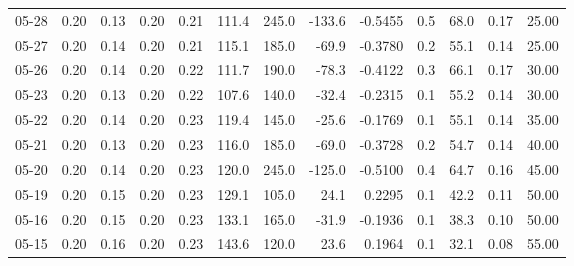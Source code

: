 \begin{threeparttable}
{\begin{tabular}{lrrrrrrrrrrrr}
  05-28 &          0.20 &          0.13 &          0.20 &        0.21 &               111.4 &               245.0 &     -133.6 &      -0.5455 &                 0.5 &             68.0 &            0.17 &                  25.00 \\
  05-27 &          0.20 &          0.14 &          0.20 &        0.21 &               115.1 &               185.0 &      -69.9 &      -0.3780 &                 0.2 &             55.1 &            0.14 &                  25.00 \\
  05-26 &          0.20 &          0.14 &          0.20 &        0.22 &               111.7 &               190.0 &      -78.3 &      -0.4122 &                 0.3 &             66.1 &            0.17 &                  30.00 \\
  05-23 &          0.20 &          0.13 &          0.20 &        0.22 &               107.6 &               140.0 &      -32.4 &      -0.2315 &                 0.1 &             55.2 &            0.14 &                  30.00 \\
  05-22 &          0.20 &          0.14 &          0.20 &        0.23 &               119.4 &               145.0 &      -25.6 &      -0.1769 &                 0.1 &             55.1 &            0.14 &                  35.00 \\
  05-21 &          0.20 &          0.13 &          0.20 &        0.23 &               116.0 &               185.0 &      -69.0 &      -0.3728 &                 0.2 &             54.7 &            0.14 &                  40.00 \\
  05-20 &          0.20 &          0.14 &          0.20 &        0.23 &               120.0 &               245.0 &     -125.0 &      -0.5100 &                 0.4 &             64.7 &            0.16 &                  45.00 \\
  05-19 &          0.20 &          0.15 &          0.20 &        0.23 &               129.1 &               105.0 &       24.1 &       0.2295 &                 0.1 &             42.2 &            0.11 &                  50.00 \\
  05-16 &          0.20 &          0.15 &          0.20 &        0.23 &               133.1 &               165.0 &      -31.9 &      -0.1936 &                 0.1 &             38.3 &            0.10 &                  50.00 \\
  05-15 &          0.20 &          0.16 &          0.20 &        0.23 &               143.6 &               120.0 &       23.6 &       0.1964 &                 0.1 &             32.1 &            0.08 &                  55.00 \\

\end{tabular}}
\end{threeparttable}

